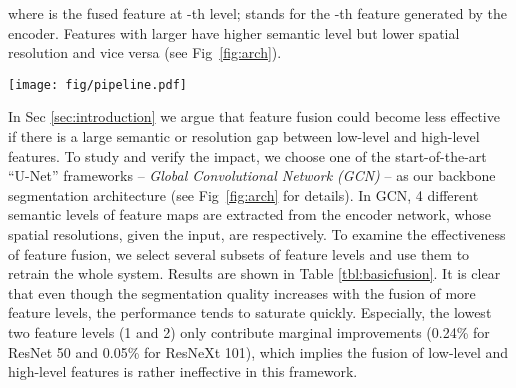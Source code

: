 \documentclass[runningheads]{llncs}
\begin{document}
where  is the fused feature at -th level;  stands for the -th feature generated by the encoder. Features with larger  have higher semantic level but lower spatial resolution and vice versa (see Fig~\ref{fig:arch}). 

\begin{figure*}[t]
\begin{center}
\texttt{[image: fig/pipeline.pdf]}
\end{center}
   \caption{Overall architecture of our approach. Components with solid boxes belong to the backbone \emph{GCN} framework \cite{Peng2017Large}, while others with dashed lines are proposed in this work. Similar to \cite{Peng2017Large}, \emph{Boundary Refinement} blocks are actually used but omitted in the figure. Numbers () in blocks specify the output dimension of each component. \textbf{SS} -- semantic supervision. \textbf{ECRE} -- explicit channel resolution embedding. \textbf{SEB} -- semantic embedding branch. \textbf{DAP} -- densely adjacent prediction.}
\label{fig:arch}
\end{figure*}


In Sec \ref{sec:introduction} we argue that feature fusion could become less effective if there is a large semantic or resolution gap between low-level and high-level features. To study and verify the impact, we choose one of the start-of-the-art ``U-Net'' frameworks -- \emph{Global Convolutional Network (GCN)} \cite{Peng2017Large} -- as our backbone segmentation architecture (see Fig~\ref{fig:arch} for details). In GCN, 4 different semantic levels of feature maps are extracted from the encoder network, whose spatial resolutions, given the  input, are  respectively. To examine the effectiveness of feature fusion, we select several subsets of feature levels and use them to retrain the whole system. Results are shown in Table \ref{tbl:basicfusion}. It is clear that even though the segmentation quality increases with the fusion of more feature levels, the performance tends to saturate quickly. Especially, the lowest two feature levels (1 and 2) only contribute marginal improvements (0.24\% for ResNet 50 and 0.05\% for ResNeXt 101), which implies the fusion of low-level and high-level features is rather ineffective in this framework.
\end{document}
